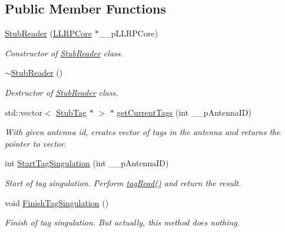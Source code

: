 \subsection*{Public Member Functions}
\begin{DoxyCompactItemize}
\item 
\hyperlink{class_e_l_f_i_n_1_1_stub_reader_ac676e8135f5801760de486d5aa667eb9}{Stub\-Reader} (\hyperlink{class_e_l_f_i_n_1_1_l_l_r_p_core}{L\-L\-R\-P\-Core} $\ast$\-\_\-\-\_\-p\-L\-L\-R\-P\-Core)
\begin{DoxyCompactList}\small\item\em Constructor of \hyperlink{class_e_l_f_i_n_1_1_stub_reader}{Stub\-Reader} class. \end{DoxyCompactList}\item 
\hyperlink{class_e_l_f_i_n_1_1_stub_reader_a23685824e94dd0ce0a619ba6357024a2}{$\sim$\-Stub\-Reader} ()
\begin{DoxyCompactList}\small\item\em Destructor of \hyperlink{class_e_l_f_i_n_1_1_stub_reader}{Stub\-Reader} class. \end{DoxyCompactList}\item 
std\-::vector$<$ \hyperlink{class_e_l_f_i_n_1_1_stub_tag}{Stub\-Tag} $\ast$ $>$ $\ast$ \hyperlink{class_e_l_f_i_n_1_1_stub_reader_a3341bdca0a4281bbd10dd1af25ef575e}{get\-Current\-Tags} (int \-\_\-\-\_\-p\-Antenna\-I\-D)
\begin{DoxyCompactList}\small\item\em With given antenna id, creates vector of tags in the antenna and returns the pointer to vector. \end{DoxyCompactList}\item 
int \hyperlink{class_e_l_f_i_n_1_1_stub_reader_afb590c28e767dd82fcdf756f3b1a22a2}{Start\-Tag\-Singulation} (int \-\_\-\-\_\-p\-Antenna\-I\-D)
\begin{DoxyCompactList}\small\item\em Start of tag singulation. Perform \hyperlink{class_e_l_f_i_n_1_1_stub_reader_ad2da9e11a05b0d1970fd10617fd66643}{tag\-Read()} and return the result. \end{DoxyCompactList}\item 
void \hyperlink{class_e_l_f_i_n_1_1_stub_reader_a9cbe939234961937b64a33e2971885c7}{Finish\-Tag\-Singulation} ()
\begin{DoxyCompactList}\small\item\em Finish of tag singulation. But actually, this method does nothing. \end{DoxyCompactList}\item 

\end{DoxyCompactItemize}
